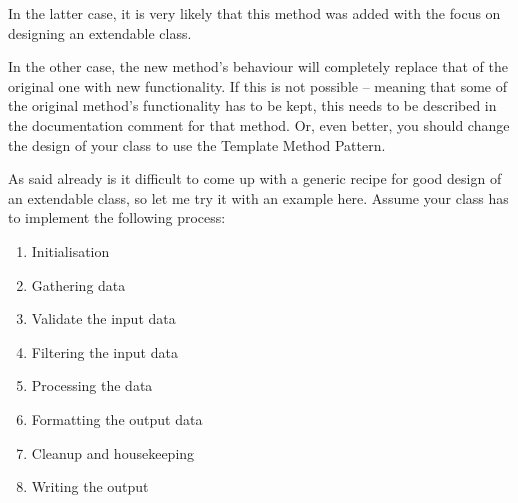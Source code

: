 \documentclass[11pt,a4paper, titlepage, parskip=half, headsepline, footsepline, cleardoublepage=current, headheight=1cm]{scrbook}
\begin{document}
In the latter case, it is very likely that this method was added with the focus on designing an extendable class.

In the other case, the new method's behaviour will completely replace that of the original one with new functionality. If this is not possible – meaning that some of the original method's functionality has to be kept, this needs to be described in the documentation comment for that method. Or, even better, you should change the design of your class to use the Template Method Pattern\autocite{Gamma:DesignPatterns}.

As said already is it difficult to come up with a generic recipe for good design of an extendable class, so let me try it with an example here. Assume your class has to implement the following process:
\begin{enumerate}
\item{Initialisation}
\item{Gathering data}
\item{Validate the input data}
\item{Filtering the input data}
\item{Processing the data}
\item{Formatting the output data}
\item{Cleanup and housekeeping}
\item{Writing the output}
\end{enumerate}
\end{document}
